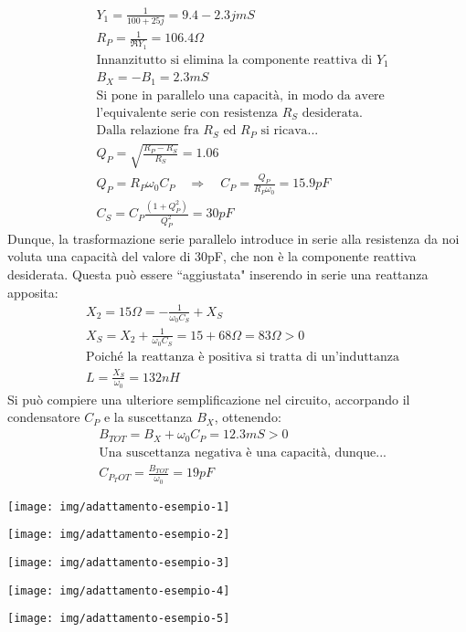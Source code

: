\begin{minipage}{0.7\linewidth}
\begin{align*}
& Y_1 = \frac{1}{100+25j} = 9.4-2.3j mS\\
& R_P = \frac{1}{\Re{Y_1}} = 106.4 \Omega\\
&\mbox{Innanzitutto si elimina la componente reattiva di $Y_1$}\\
& B_X = -B_1 = 2.3 mS\\
&\mbox{Si pone in parallelo una capacità, in modo da avere}\\
&\mbox{l'equivalente serie con resistenza $R_S$ desiderata.}\\
&\mbox{Dalla relazione fra $R_S$ ed $R_P$ si ricava...}\\
& Q_P = \sqrt{\frac{R_P-R_S}{R_S}} = 1.06\\
& Q_P = R_P \omega_0 C_P
\quad\Rightarrow\quad
C_P = \frac{Q_P}{R_P \omega_0} = 15.9 pF\\
& C_S = C_P \frac{(1+Q_P^2)}{Q_P^2} = 30 pF
\end{align*}
Dunque, la trasformazione serie parallelo introduce in serie alla resistenza da noi voluta una capacità del valore di 30pF, che non è la componente reattiva desiderata. Questa può essere ``aggiustata" inserendo in serie una reattanza apposita:
\begin{align*}
&X_2 = 15\Omega = -\frac{1}{\omega_0C_S} + X_S\\
&X_S = X_2 +\frac{1}{\omega_0C_S} = 15+68 \Omega
= 83\Omega > 0 \\
&\mbox{Poiché la reattanza è positiva si tratta di un'induttanza}\\
&L = \frac{X_S}{\omega_0} = 132nH
\end{align*}
Si può compiere una ulteriore semplificazione nel circuito, accorpando il condensatore $C_P$ e la suscettanza $B_X$, ottenendo:
\begin{align*}
&B_{TOT} = B_X + \omega_0C_P = 12.3mS > 0\\
&\mbox{Una suscettanza negativa è una capacità, dunque...}\\
&C_{P_TOT} = \frac{B_{TOT}}{\omega_0} = 19pF
\end{align*}
\end{minipage}
\begin{minipage}{0.3\linewidth}
\centering

\texttt{[image: img/adattamento-esempio-1]}
\vspace{2em}

\texttt{[image: img/adattamento-esempio-2]}

\vspace{2em}
\texttt{[image: img/adattamento-esempio-3]}

\vspace{2em}
\texttt{[image: img/adattamento-esempio-4]}

\vspace{2em}
\texttt{[image: img/adattamento-esempio-5]}
\end{minipage}

